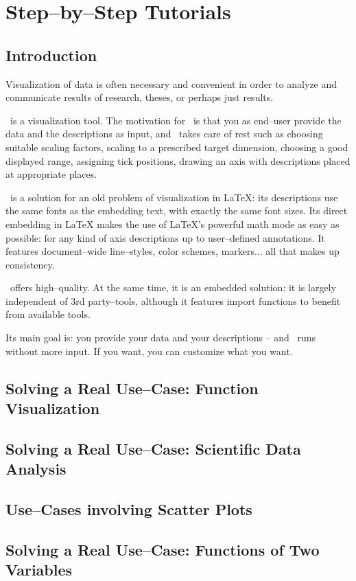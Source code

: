 
\chapter{Step--by--Step Tutorials}
{%
%

\section{Introduction}
Visualization of data is often necessary and convenient in order to analyze and communicate results of research, theses, or perhaps just results.

\PGFPlots\ is a visualization tool. The motivation for \PGFPlots\ is that you as end--user provide the data and the descriptions as input, and \PGFPlots\ takes care of rest such as choosing suitable scaling factors, scaling to a prescribed target dimension, choosing a good displayed range, assigning tick positions, drawing an axis with descriptions placed at appropriate places.

\PGFPlots\ is a solution for an old problem of visualization in LaTeX: its descriptions use the same fonts as the embedding text, with exactly the same font sizes. Its direct embedding in LaTeX makes the use of LaTeX's powerful math mode as easy as possible: for any kind of axis descriptions up to user--defined annotations. It features document--wide line--styles, color schemes, markers... all that makes up consistency. 

\PGFPlots\ offers high--quality. At the same time, it is an embedded solution: it is largely independent of 3rd party--tools, although it features import functions to benefit from available tools.

Its main goal is: you provide your data and your descriptions -- and \PGFPlots\ runs without more input. If you want, you can customize what you want.

\section{Solving a Real Use--Case: Function Visualization}



\section{Solving a Real Use--Case: Scientific Data Analysis}



\section{Use--Cases involving Scatter Plots}



\section{Solving a Real Use--Case: Functions of Two Variables}


}%
\endinput
